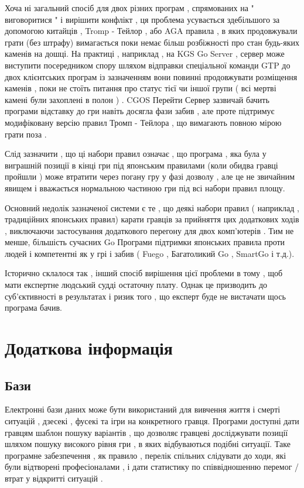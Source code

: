 Хоча ні загальний спосіб для двох різних програм , спрямованих на " виговоритися " і вирішити конфлікт , ця проблема усувається здебільшого за допомогою китайців , Tromp - Тейлор , або AGA правила , в яких продовжували грати (без штрафу) вимагається поки немає більш розбіжності про стан будь-яких каменів на дошці. На практиці , наприклад , на KGS Go Server , сервер може виступити посередником спору шляхом відправки спеціальної команди GTP до двох клієнтських програм із зазначенням вони повинні продовжувати розміщення каменів , поки не стоїть питання про статус тієї чи іншої групи ( всі мертві камені були захоплені в полон ) . CGOS Перейти Сервер зазвичай бачить програми відставку до гри навіть досягла фази забив , але проте підтримує модифіковану версію правил Тромп - Тейлора , що вимагають повною мірою грати поза .

Слід зазначити , що ці набори правил означає , що програма , яка була у виграшній позиції в кінці гри під японським правилами (коли обидва гравці пройшли ) може втратити через погану гру у фазі дозволу , але це не звичайним явищем і вважається нормальною частиною гри під всі набори правил площу.

Основний недолік зазначеної системи є те , що деякі набори правил ( наприклад , традиційних японських правил) карати гравців за прийняття цих додаткових ходів , виключаючи застосування додаткового перегону для двох комп'ютерів . Тим не менше, більшість сучасних Go Програми підтримки японських правила проти людей і компетентні як у грі і забив ( Fuego , Багатоликий Go , SmartGo і т.д.).

Історично склалося так , інший спосіб вирішення цієї проблеми в тому , щоб мати експертне людський судді остаточну плату. Однак це призводить до суб'єктивності в результатах і ризик того , що експерт буде не вистачати щось програма бачив.

\newpage
\section{Додаткова інформація}
\subsection{Бази}
Електронні бази даних може бути використаний для вивчення життя і смерті ситуацій , дзесекі , фусекі та ігри на конкретного гравця. Програми доступні дати гравцям шаблон пошуку варіантів , що дозволяє гравцеві досліджувати позиції шляхом пошуку високого рівня гри , в яких відбуваються подібні ситуації. Таке програмне забезпечення , як правило , перелік спільних слідувати до ходи, які були відтворені професіоналами , і дати статистику по співвідношенню перемог / втрат у відкритті ситуацій .

